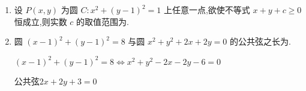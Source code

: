 \begin{enumerate}
\begin{jieda}
        故答案为：$(x-1)^2+(y-\sqrt{3})^2=1$ 或 $(x+1)^2+(y+\sqrt{3})^2=1$ 或$(x-2 \sqrt{3}-3)^2+(y+2+\sqrt{3})^2=21+12 \sqrt{3}$ 或 $(x+2 \sqrt{3}+3)^2+(y-2-\sqrt{3})^2=21+12 \sqrt{3}($ 写出其中一个即可）
    \end{jieda}

    \item  设 $P\left( {x,y}\right)$ 为圆 $C : {x}^{2} + {\left( y - 1\right) }^{2} = 1$ 上任意一点,欲使不等式 $x + y + c \geq  0$ 恒成立,则实数 $c$ 的取值范围为\blkda[3]{$[\sqrt{2}-1,+\infty$)}.

    \item 圆 ${\left( x - 1\right) }^{2} + {\left( y - 1\right) }^{2} = 8$ 与圆 ${x}^{2} + {y}^{2} + {2x} + {2y} = 0$ 的公共弦之长为.
    \begin{jieda}
        ${\left( x - 1\right) }^{2} + {\left( y - 1\right) }^{2} = 8 \Longleftrightarrow x^2+y^2-2x-2y-6=0$
        
        公共弦$2x+2y+3=0$
        

\end{jieda}
\end{enumerate}
